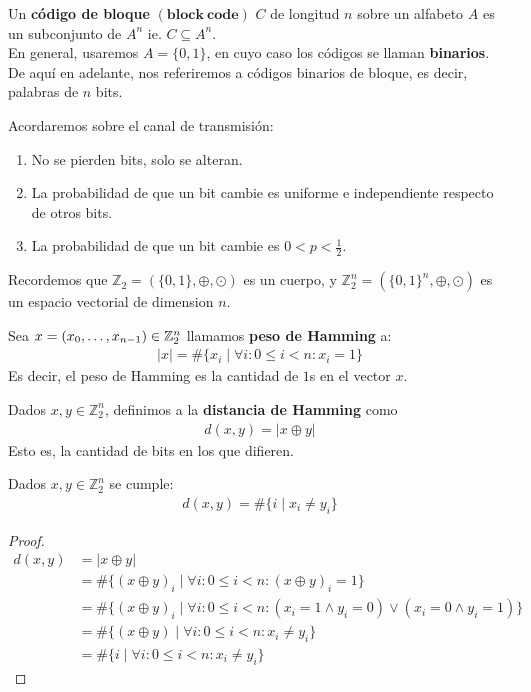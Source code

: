 \begin{definition}
Un \textbf{código de bloque} $(\boldsymbol{block\ code})$ $C$ de longitud $n$ sobre un alfabeto $A$ es un subconjunto de $A^n$ ie. $C \subseteq A^n$.\\
En general, usaremos $A = \{0,1\}$, en cuyo caso los códigos se llaman \textbf{binarios}.\\
De aquí en adelante, nos referiremos a códigos binarios de bloque, es decir, palabras de $n$ bits.
\end{definition}

Acordaremos sobre el canal de transmisión:
\begin{enumerate}
\item No se pierden bits, solo se alteran.
\item La probabilidad de que un bit cambie es uniforme e independiente respecto de otros bits.
\item La probabilidad de que un bit cambie es $0 < p < \frac{1}{2}$.
\end{enumerate}
\begin{definition}
Recordemos que $\mathbb{Z}_2 = (\{0,1\}, \oplus, \odot)$ es un cuerpo, y ${\mathbb{Z}_2^n} = (\{0,1\}^n, \oplus, \odot)$ es un espacio vectorial de dimension $n$.
\end{definition}

\begin{definition}
Sea $x = (x_0,\mathellipsis, x_{n-1}) \in \mathbb{Z}_2^n$ llamamos \textbf{peso de Hamming} a: \begin{align}
|x| = \#\{x_i \mid \forall i: 0\le i < n : x_i = 1\}
\end{align}
Es decir, el peso de Hamming es la cantidad de $1$s en el vector $x$.
\end{definition}

\begin{definition}
Dados $x,y \in \mathbb{Z}_2^n$, definimos a la \textbf{distancia de Hamming} como
\begin{align}
d(x,y) = |x\oplus y|
\end{align}
Esto es, la cantidad de bits en los que difieren.
\end{definition}

\begin{proposition}
Dados $x,y \in \mathbb{Z}_2^n$ se cumple: \begin{align}
d(x,y) = \#\{i\mid x_i \neq y_i\}
\end{align}
\end{proposition}
\begin{proof}
\begin{align}
d(x,y) &= |x\oplus y| \\
&= \#\{(x\oplus y)_i \mid \forall i : 0 \le i < n: (x\oplus y)_i = 1\} \\
&= \#\{(x\oplus y)_i \mid \forall i : 0 \le i < n: (x_i = 1 \wedge y_i = 0) \vee (x_i = 0 \wedge y_i = 1)\} \\
&= \#\{(x\oplus y) \mid \forall i: 0 \le i < n: x_i \neq y_i\}\\
&= \#\{i \mid \forall i: 0 \le i < n: x_i \neq y_i\}
\end{align}
\end{proof}

